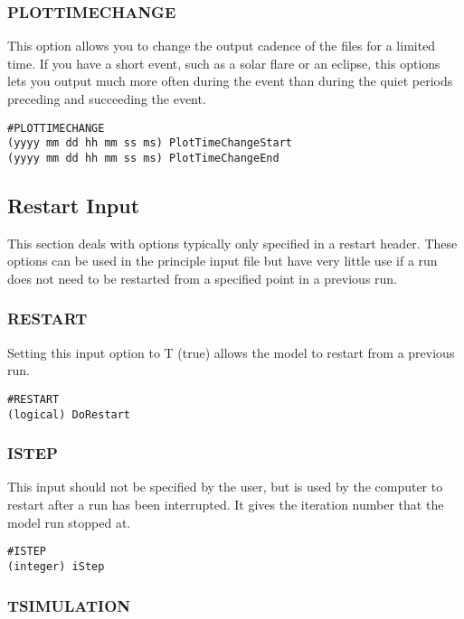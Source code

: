 \subsubsection{PLOTTIMECHANGE}
\label{plottimechange.sec}

This option allows you to change the output cadence of the files for a limited time.  If you have a short event, such as a solar flare or an eclipse, this options lets you output much more often during the event than during the quiet periods preceding and succeeding the event.

\begin{verbatim}
#PLOTTIMECHANGE
(yyyy mm dd hh mm ss ms) PlotTimeChangeStart
(yyyy mm dd hh mm ss ms) PlotTimeChangeEnd
\end{verbatim}



\subsection{Restart Input}

This section deals with options typically only specified in a restart header.  These options can be used in the principle input file but have very little use if a run does not need to be restarted from a specified point in a previous run.

\subsubsection{RESTART}

Setting this input option to T (true) allows the model to restart from a previous run.

\begin{verbatim}
#RESTART
(logical) DoRestart
\end{verbatim}

\subsubsection{ISTEP}
\label{istep.sec}

This input should not be specified by the user, but is used by the computer to restart after a run has been interrupted.  It gives the iteration number that the model run stopped at.

\begin{verbatim}
#ISTEP
(integer) iStep
\end{verbatim}

\subsubsection{TSIMULATION}

